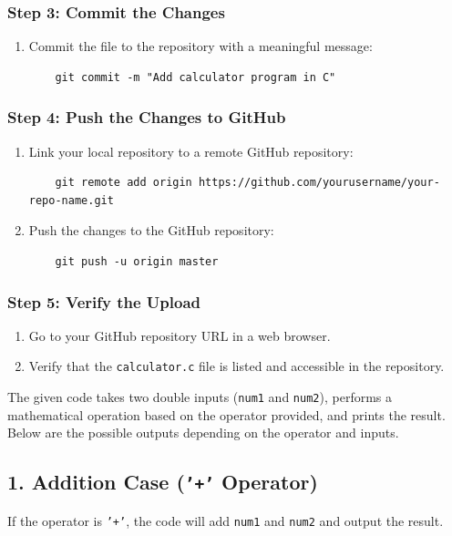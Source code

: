 \documentclass{article}
\begin{document}
\subsubsection{Step 3: Commit the Changes}
\begin{enumerate}
    \item Commit the file to the repository with a meaningful message:
    \begin{verbatim}
    git commit -m "Add calculator program in C"
    \end{verbatim}
\end{enumerate}

\subsubsection{Step 4: Push the Changes to GitHub}
\begin{enumerate}
    \item Link your local repository to a remote GitHub repository:
    \begin{verbatim}
    git remote add origin https://github.com/yourusername/your-repo-name.git
    \end{verbatim}
    \item Push the changes to the GitHub repository:
    \begin{verbatim}
    git push -u origin master
    \end{verbatim}
\end{enumerate}

\subsubsection{Step 5: Verify the Upload}
\begin{enumerate}
    \item Go to your GitHub repository URL in a web browser.
    \item Verify that the \texttt{calculator.c} file is listed and accessible in the repository.
\end{enumerate}
The given code takes two double inputs (\texttt{num1} and \texttt{num2}), performs a mathematical operation based on the operator provided, and prints the result. Below are the possible outputs depending on the operator and inputs.

\subsection{1. Addition Case (\texttt{'+'} Operator)}
If the operator is \texttt{'+'}, the code will add \texttt{num1} and \texttt{num2} and output the result.
\end{document}

